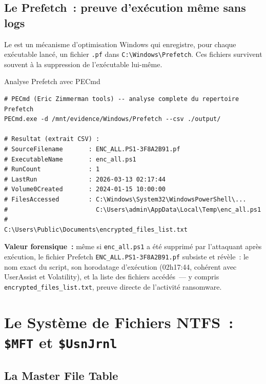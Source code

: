 \subsection{Le Prefetch~: preuve d'exécution même sans logs}

Le  est un mécanisme d'optimisation
Windows qui enregistre, pour chaque exécutable lancé, un fichier
\texttt{.pf} dans \texttt{C:\textbackslash Windows\textbackslash Prefetch}.
Ces fichiers survivent souvent à la suppression de l'exécutable lui-même.

\begin{boxoutils}{Analyse Prefetch avec PECmd}
\begin{lstlisting}[language=bash_forensique]
# PECmd (Eric Zimmerman tools) -- analyse complete du repertoire Prefetch
PECmd.exe -d /mnt/evidence/Windows/Prefetch --csv ./output/

# Resultat (extrait CSV) :
# SourceFilename       : ENC_ALL.PS1-3F8A2B91.pf
# ExecutableName       : enc_all.ps1
# RunCount             : 1
# LastRun              : 2026-03-13 02:17:44
# Volume0Created       : 2024-01-15 10:00:00
# FilesAccessed        : C:\Windows\System32\WindowsPowerShell\...
#                        C:\Users\admin\AppData\Local\Temp\enc_all.ps1
#                        C:\Users\Public\Documents\encrypted_files_list.txt
\end{lstlisting}
\textbf{Valeur forensique~:} même si \texttt{enc\_all.ps1} a été supprimé
par l'attaquant après exécution, le fichier Prefetch
\texttt{ENC\_ALL.PS1-3F8A2B91.pf} subsiste et révèle~: le nom exact du
script, son horodatage d'exécution (02h17:44, cohérent avec UserAssist
et Volatility), et la liste des fichiers accédés~--- y compris
\texttt{encrypted\_files\_list.txt}, preuve directe de l'activité ransomware.
\end{boxoutils}

\section{Le Système de Fichiers NTFS~: \texttt{\$MFT} et \texttt{\$UsnJrnl}}
\label{sec:ntfs}

\subsection{La Master File Table}

